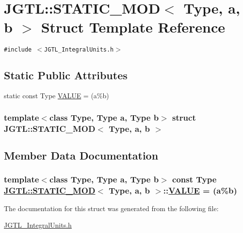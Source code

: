 \hypertarget{struct_j_g_t_l_1_1_s_t_a_t_i_c___m_o_d}{
\section{JGTL::STATIC\_\-MOD$<$ Type, a, b $>$ Struct Template Reference}
\label{struct_j_g_t_l_1_1_s_t_a_t_i_c___m_o_d}
}
{\tt \#include $<$JGTL\_\-Integral\-Units.h$>$}

\subsection*{Static Public Attributes}
\begin{CompactItemize}
\item 
static const Type \hyperlink{struct_j_g_t_l_1_1_s_t_a_t_i_c___m_o_d_3fd89df40d6d5c8cbe8adebba3729199}{VALUE} = (a\%b)
\end{CompactItemize}
\subsubsection*{template$<$class Type, Type a, Type b$>$ struct JGTL::STATIC\_\-MOD$<$ Type, a, b $>$}



\subsection{Member Data Documentation}
\hypertarget{struct_j_g_t_l_1_1_s_t_a_t_i_c___m_o_d_3fd89df40d6d5c8cbe8adebba3729199}{
\subsubsection[VALUE]{\setlength{\rightskip}{0pt plus 5cm}template$<$class Type, Type a, Type b$>$ const Type \hyperlink{struct_j_g_t_l_1_1_s_t_a_t_i_c___m_o_d}{JGTL::STATIC\_\-MOD}$<$ Type, a, b $>$::\hyperlink{struct_j_g_t_l_1_1_s_t_a_t_i_c___m_o_d_3fd89df40d6d5c8cbe8adebba3729199}{VALUE} = (a\%b)}}
\label{struct_j_g_t_l_1_1_s_t_a_t_i_c___m_o_d_3fd89df40d6d5c8cbe8adebba3729199}




The documentation for this struct was generated from the following file:\begin{CompactItemize}
\item 
\hyperlink{_j_g_t_l___integral_units_8h}{JGTL\_\-Integral\-Units.h}\end{CompactItemize}
